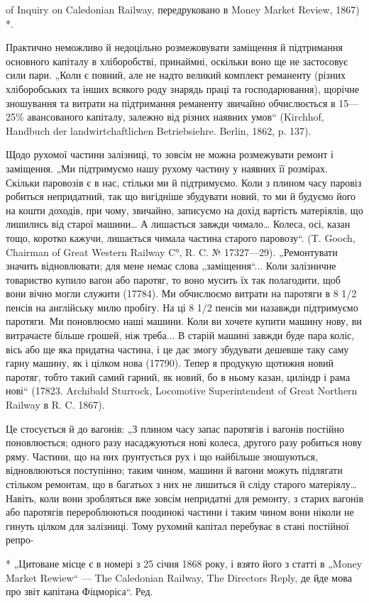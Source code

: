 of Inquiry on Caledonian Railway, передруковано в Money Market Review, 1867) *.

Практично неможливо й недоцільно розмежовувати заміщення й підтримання основного капіталу в
хліборобстві, принаймні, оскільки воно ще не застосовує сили пари. „Коли є повний, але не надто
великий комплект реманенту (різних хліборобських та інших всякого роду знарядь праці та
господарювання), щорічне зношування та витрати на підтримання реманенту звичайно обчислюється в
15—25\% авансованого капіталу, залежно від різних наявних умов“ (Kirchhof, Handbuch der
landwirtchaftlichen Betriebsiehre. Berlin, 1862, p. 137).

Щодо рухомої частини залізниці, то зовсім не можна розмежувати ремонт і заміщення. „Ми підтримуємо
нашу рухому частину у наявних її розмірах. Скільки паровозів є в нас, стільки ми й підтримуємо. Коли
з плином часу паровіз робиться непридатний, так що вигідніше збудувати новий, то ми й будуємо його
на кошти доходів, при чому, звичайно, записуємо на дохід вартість матеріялів, що лишились від старої
машини… А лишається завжди чимало… Колеса, осі, казан тощо, коротко кажучи, лишається чимала частина
старого паровозу“. (T. Gooch, Chairman of Great Western Railway C°, R. C. № 17327—29). „Ремонтувати
значить відновлювати; для мене немає слова „заміщення“... Коли залізничне товариство купило вагон
або паротяг, то воно мусить їх так полагодити, щоб вони вічно могли служити (17784). Ми обчислюємо
витрати на паротяги в 8 1/2 пенсів на англійську милю пробігу. На ці 8 1/2 пенсів ми назавжди
підтримуємо паротяги. Ми поновлюємо наші машини. Коли ви хочете купити машину нову, ви витрачаєте
більше грошей, ніж треба... В старій машині завжди буде пара коліс, вісь або ще яка придатна
частина, і це дає змогу збудувати дешевше таку саму гарну машину, як і цілком нова (17790). Тепер я
продукую щотижня новий паротяг, тобто такий самий гарний, як новий, бо в ньому казан, циліндр і рама
нові“ (17823. Archibald Sturrock, Locomotive Superintendent of Great Northern Railway в R. C. 1867).

Це стосується й до вагонів: „З плином часу запас паротягів і вагонів постійно поновлюється; одного
разу насаджуються нові колеса, другого разу робиться нову ряму. Частини, що на них ґрунтується рух і
що найбільше зношуються, відновлюються поступінно; таким чином, машини й вагони можуть підлягати
стільком ремонтам, що в багатьох з них не лишиться й сліду старого матеріялу… Навіть, коли вони
зробляться вже зовсім непридатні для ремонту, з старих вагонів або паротягів перероблюються
поодинокі частини і таким чином вони ніколи не гинуть цілком для залізниці. Тому рухомий капітал
перебуває в стані постійної репро-

* „Цитоване місце є в номері з 25 січня 1868 року, і взято його з статті в „Money Market Rewiew“ —
The Caledonian Railway, The Directors Reply, де йде мова про звіт капітана Фіцморіса“. Ред.
